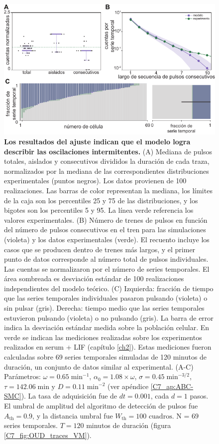 \documentclass[./main.tex]{subfiles}
\begin{document}
\begin{figure}
    \centering
    \includegraphics[width=1\columnwidth]{figures/chapter7/C7_OUD_validation.pdf} 
    \caption{\textbf{Los resultados del ajuste indican que el modelo logra describir las oscilaciones intermitentes.} (A) Mediana de pulsos totales, aislados y consecutivos divididos la duración de cada traza, normalizados por la mediana de las correspondientes distribuciones experimentales (puntos negros). Los datos provienen de 100 realizaciones. Las barras de color representan la mediana, los límites de la caja son los percentiles 25 y 75 de las distribuciones, y los bigotes son los percentiles 5 y 95. La línea verde referencia los valores experimentales. (B) Número de trenes de pulsos en función del número de pulsos consecutivos en el tren para las simulaciones (violeta) y los datos experimentales (verde). El recuento incluye los casos que se producen dentro de trenes más largos, y el primer punto de datos corresponde al número total de pulsos individuales. Las cuentas se normalizaron por el número de series temporales. El área sombreada es desviación estándar de 100 realizaciones independientes del modelo teórico. (C) Izquierda: fracción de tiempo que las series temporales individuales pasaron pulsando (violeta) o sin pulsar (gris). Derecha: tiempo medio que las series temporales estuvieron pulsando (violeta) o no pulsando (gris). La barra de error indica la desviación estándar medida sobre la población celular. En verde se indican las mediciones realizadas sobre los experimentos realizados en serum + LIF (capítulo \ref{ch2}). Estas mediciones fueron calculadas sobre 69 series temporales simuladas de 120 minutos de duración, un conjunto de datos similar al experimental. (A-C) Parámetros:  $\omega = 0.65 \; \text{min}^{-1}$, $\alpha_0 = 1.08 \times \omega$, $ \sigma = 0.45 \; \text{min}^{-3/2}$, $\tau = 142.06 \; \text{min} $ y $D = 0.11 \; \text{min}^{-2}$ (ver apéndice \ref{C7_ap:ABC-SMC}). La tasa de adquisición fue de $dt = 0.001$, cada $d = 1$ pasos. El umbral de amplitud del algoritmo de detección de pulsos fue $A_{\text{th}} = 0.9$, y la distancia umbral fue $W_{\text{th}} = 100\text{ cuadros}$. N = $69$ series temporales. $T = 120$ minutos de duración (figura \ref{C7_fig:OUD_traces_VM}).}
    \label{C7_fig:OUD_param_evaluation}
\end{figure} 
\end{document}
